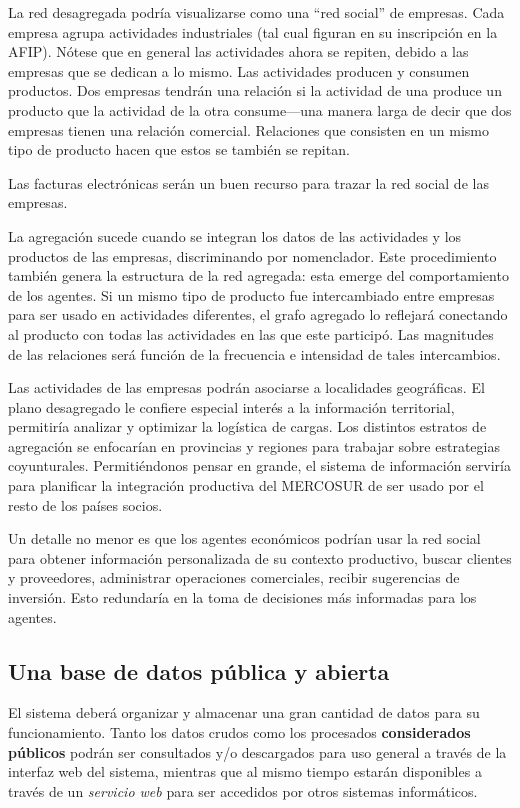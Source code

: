 \documentclass[a4paper]{report}
\begin{document}
La red desagregada podría visualizarse como una ``red social'' de empresas. Cada empresa agrupa actividades industriales (tal cual figuran en su inscripción en la AFIP). Nótese que en general las actividades ahora se repiten, debido a las empresas que se dedican a lo mismo. Las actividades producen y consumen productos. Dos empresas tendrán una relación si la actividad de una produce un producto que la actividad de la otra consume—una manera larga de decir que dos empresas tienen una relación comercial. Relaciones que consisten en un mismo tipo de producto hacen que estos se también se repitan.

Las facturas electrónicas serán un buen recurso para trazar la red social de las empresas.

La agregación sucede cuando se integran los datos de las actividades y los productos de las empresas, discriminando por nomenclador. Este procedimiento también genera la estructura de la red agregada: esta emerge del comportamiento de los agentes. Si un mismo tipo de producto fue intercambiado entre empresas para ser usado en actividades diferentes, el grafo agregado lo reflejará conectando al producto con todas las actividades en las que este participó. Las magnitudes de las relaciones será función de la frecuencia e intensidad de tales intercambios.

Las actividades de las empresas podrán asociarse a localidades geográficas. El plano desagregado le confiere especial interés a la información territorial, permitiría analizar y optimizar la logística de cargas. Los distintos estratos de agregación se enfocarían en provincias y regiones para trabajar sobre estrategias coyunturales. Permitiéndonos pensar en grande, el sistema de información serviría para planificar la integración productiva del MERCOSUR de ser usado por el resto de los países socios.

Un detalle no menor es que los agentes económicos podrían usar la red social para obtener información personalizada de su contexto productivo, buscar clientes y proveedores, administrar operaciones comerciales, recibir sugerencias de inversión. Esto redundaría en la toma de decisiones más informadas para los agentes.

\subsection*{Una base de datos pública y abierta}

El sistema deberá organizar y almacenar una gran cantidad de datos para su funcionamiento. Tanto los datos crudos como los procesados \textbf{considerados públicos} podrán ser consultados y/o descargados para uso general a través de la interfaz web del sistema, mientras que al mismo tiempo estarán disponibles a través de un \textit{servicio web} para ser accedidos por otros sistemas informáticos.
\end{document}

